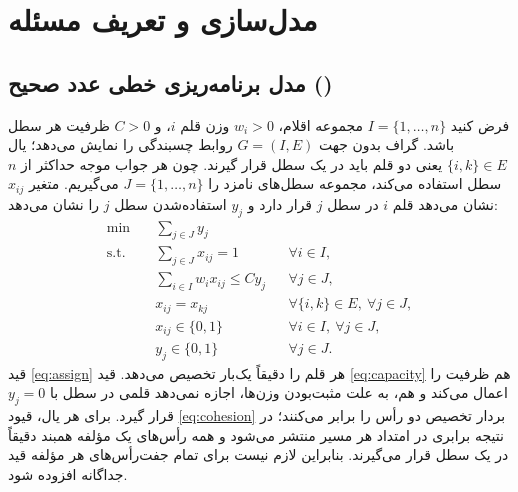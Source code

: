 \section{مدل‌سازی و تعریف مسئله}

\subsection{مدل برنامه‌ریزی خطی عدد صحیح ()}\label{subsec:lr_ilp}
فرض کنید $I=\{1,\ldots,n\}$ مجموعه اقلام، $w_i>0$ وزن قلم $i$، و $C>0$ ظرفیت هر سطل باشد. گراف بدون جهت $G=(I,E)$ روابط چسبندگی را نمایش می‌دهد؛ یال $\{i,k\}\in E$ یعنی دو قلم باید در یک سطل قرار گیرند. چون هر جواب موجه حداکثر از $n$ سطل استفاده می‌کند، مجموعه سطل‌های نامزد را $J=\{1,\ldots,n\}$ می‌گیریم. متغیر $x_{ij}$ نشان می‌دهد قلم $i$ در سطل $j$ قرار دارد و $y_j$ استفاده‌شدن سطل $j$ را نشان می‌دهد:
\begin{align}
    \min \quad & \sum_{j\in J} y_j \label{eq:obj} \\
    \text{s.t.}\quad
    & \sum_{j\in J} x_{ij}=1 && \forall i\in I, \label{eq:assign} \\
    & \sum_{i\in I} w_i x_{ij}\leq C y_j && \forall j\in J, \label{eq:capacity} \\
    & x_{ij}=x_{kj} && \forall \{i,k\}\in E,\ \forall j\in J, \label{eq:cohesion} \\
    & x_{ij}\in\{0,1\} && \forall i\in I,\ \forall j\in J, \label{eq:x_binary} \\
    & y_j\in\{0,1\} && \forall j\in J. \label{eq:y_binary}
\end{align}
قید \eqref{eq:assign} هر قلم را دقیقاً یک‌بار تخصیص می‌دهد. قید \eqref{eq:capacity} هم ظرفیت را اعمال می‌کند و هم، به علت مثبت‌بودن وزن‌ها، اجازه نمی‌دهد قلمی در سطل با $y_j=0$ قرار گیرد. برای هر یال، قیود \eqref{eq:cohesion} بردار تخصیص دو رأس را برابر می‌کنند؛ در نتیجه برابری در امتداد هر مسیر منتشر می‌شود و همه رأس‌های یک مؤلفه همبند دقیقاً در یک سطل قرار می‌گیرند. بنابراین لازم نیست برای تمام جفت‌رأس‌های هر مؤلفه قید جداگانه افزوده شود.

